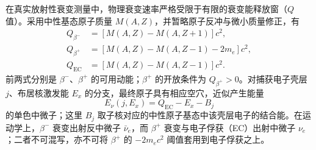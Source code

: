 在真实放射性衰变测量中，物理衰变速率严格受限于有限的衰变能释放窗（$Q$ 值）。采用中性基态原子质量 $M(A,Z)$，并暂略原子反冲与微小质量修正，有
\begin{align}
Q_{\beta^-}&=[M(A,Z)-M(A,Z+1)]c^2,\label{eq:4-7-Q-betaminus}\\
Q_{\beta^+}&=[M(A,Z)-M(A,Z-1)-2m_e]c^2,\label{eq:4-7-Q-betaplus}\\
Q_{\mathrm{EC}}&=[M(A,Z)-M(A,Z-1)]c^2.\label{eq:4-7-Q-EC}
\end{align}
前两式分别是 $\beta^-$、$\beta^+$ 的可用动能；$\beta^+$ 的开放条件为 $Q_{\beta^+}>0$。对捕获电子壳层 $j$、布居核激发能 $E_x$ 的分支，最终原子具有相应空穴，近似产生能量
\begin{equation}\label{eq:4-7-Q-EC-neutrino}
E_\nu(j,E_x)=Q_{\mathrm{EC}}-E_x-B_j
\end{equation}
的单色中微子；这里 $B_j$ 取子核对应的中性原子基态中该壳层电子的结合能。在运动学上，$\beta^-$ 衰变出射反中微子 $\bar{\nu}_e$，而 $\beta^+$ 衰变与电子俘获（EC）出射中微子 $\nu_e$；二者不可混写，亦不可将 $\beta^+$ 的 $-2m_e c^2$ 阈值套用到电子俘获之上。

